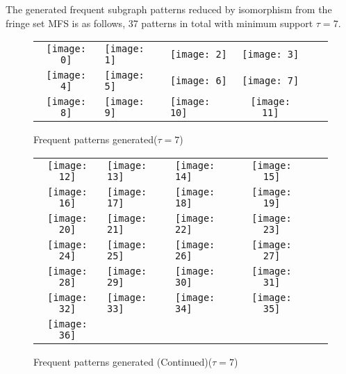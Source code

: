 \documentclass[a4paper, 12pt]{report}
\begin{document}
The generated frequent subgraph patterns reduced by isomorphism from the fringe set MFS is as follows, 37 patterns in total with minimum support $\tau=7$.
\begin{figure}[H]
\centering
    \begin{tabular}{c p{3cm}p{3cm}clc} 
            \texttt{[image: 0]}&
            \texttt{[image: 1]}&
            \texttt{[image: 2]}&
            \texttt{[image: 3]}\\
            \texttt{[image: 4]}&
            \texttt{[image: 5]}&
            \texttt{[image: 6]}&
            \texttt{[image: 7]}\\
            \texttt{[image: 8]}&
            \texttt{[image: 9]}&
            \texttt{[image: 10]}&
            \texttt{[image: 11]}\\
    \end{tabular}
    \caption{Frequent patterns generated($\tau=7$)}
\end{figure}
\begin{figure}[H]
\centering
    \begin{tabular}{c p{3cm}p{3cm}clc} 
            \texttt{[image: 12]}&
            \texttt{[image: 13]}&
            \texttt{[image: 14]}&
            \texttt{[image: 15]}\\
            \texttt{[image: 16]}&
            \texttt{[image: 17]}&
            \texttt{[image: 18]}&
            \texttt{[image: 19]}\\
            \texttt{[image: 20]}&
            \texttt{[image: 21]}&
            \texttt{[image: 22]}&
            \texttt{[image: 23]}\\
            \texttt{[image: 24]}&
            \texttt{[image: 25]}&
            \texttt{[image: 26]}&
            \texttt{[image: 27]}\\
            \texttt{[image: 28]}&
            \texttt{[image: 29]}&
            \texttt{[image: 30]}&
            \texttt{[image: 31]}\\
            \texttt{[image: 32]}&
            \texttt{[image: 33]}&
            \texttt{[image: 34]}&
            \texttt{[image: 35]}\\
            \texttt{[image: 36]}&

    \end{tabular}
    \caption{Frequent patterns generated (Continued)($\tau=7$)}
\end{figure}
\end{document}
